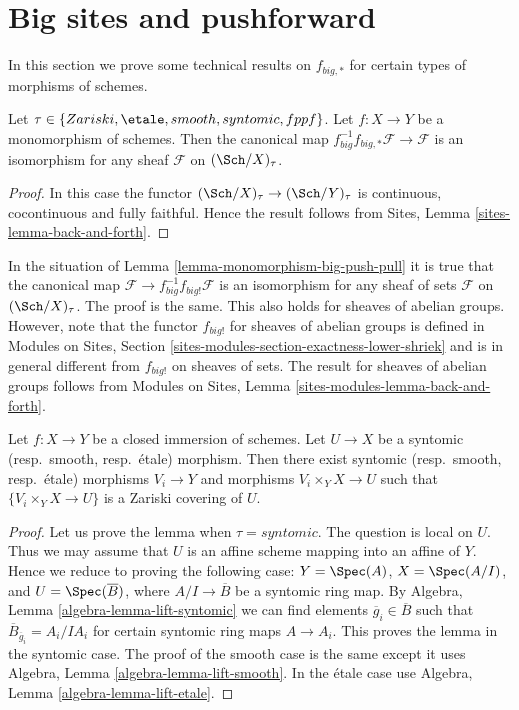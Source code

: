 \section{Big sites and pushforward}
\label{section-big}

\noindent
In this section we prove some technical results on $f_{big, *}$ for
certain types of morphisms of schemes.

\begin{lemma}
\label{lemma-monomorphism-big-push-pull}
Let $\tau \in \{Zariski, \etale, smooth, syntomic, fppf\}$.
Let $f : X \to Y$ be a monomorphism of schemes.
Then the canonical map
$f_{big}^{-1}f_{big, *}\mathcal{F} \to \mathcal{F}$
is an isomorphism for any sheaf $\mathcal{F}$ on
$(\Sch/X)_\tau$.
\end{lemma}

\begin{proof}
In this case the functor $(\Sch/X)_\tau \to (\Sch/Y)_\tau$
is continuous, cocontinuous and fully faithful. Hence the result follows from
Sites, Lemma \ref{sites-lemma-back-and-forth}.
\end{proof}

\begin{remark}
\label{remark-push-pull-shriek}
In the situation of
Lemma \ref{lemma-monomorphism-big-push-pull}
it is true that the canonical map
$\mathcal{F} \to f_{big}^{-1}f_{big!}\mathcal{F}$
is an isomorphism for any sheaf of sets $\mathcal{F}$ on
$(\Sch/X)_\tau$. The proof is the same. This also
holds for sheaves of abelian groups. However, note
that the functor $f_{big!}$ for sheaves of abelian groups is defined in
Modules on Sites, Section \ref{sites-modules-section-exactness-lower-shriek}
and is in general different from $f_{big!}$ on sheaves of sets.
The result for sheaves of abelian groups follows from
Modules on Sites, Lemma \ref{sites-modules-lemma-back-and-forth}.
\end{remark}

\begin{lemma}
\label{lemma-closed-immersion-cover-from-below}
Let $f : X \to Y$ be a closed immersion of schemes.
Let $U \to X$ be a syntomic (resp.\ smooth, resp.\ \'etale) morphism.
Then there exist syntomic (resp.\ smooth, resp.\ \'etale) morphisms
$V_i \to Y$ and morphisms $V_i \times_Y X \to U$ such that
$\{V_i \times_Y X \to U\}$ is a Zariski covering of $U$.
\end{lemma}

\begin{proof}
Let us prove the lemma when $\tau = syntomic$.
The question is local on $U$. Thus we may assume that $U$ is
an affine scheme mapping into an affine of $Y$.
Hence we reduce to proving the following case:
$Y = \Spec(A)$, $X = \Spec(A/I)$, and
$U = \Spec(\overline{B})$, where
$A/I \to \overline{B}$ be a syntomic ring map.
By Algebra, Lemma \ref{algebra-lemma-lift-syntomic}
we can find elements $\overline{g}_i \in \overline{B}$
such that
$\overline{B}_{\overline{g}_i} = A_i/IA_i$ for certain syntomic ring maps
$A \to A_i$.
This proves the lemma in the syntomic case.
The proof of the smooth case is the same except it uses
Algebra, Lemma \ref{algebra-lemma-lift-smooth}.
In the \'etale case use
Algebra, Lemma \ref{algebra-lemma-lift-etale}.
\end{proof}

